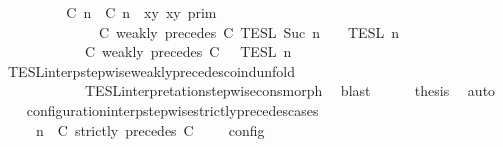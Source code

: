 \begin{isabellebody}
\ {\isacharminus}\isanewline
\ \ \ \ \isamarkupfalse%
\ {\isacartoucheopen}{\isasymlbrakk}\ {\isasymlceil}{\isacharhash}\isactrlsup {\isasymle}\ C\ n{\isacharcomma}\ {\isacharhash}\isactrlsup {\isasymle}\ C\ n{\isasymrceil}\ {\isasymin}\ {\isacharparenleft}{\isasymlambda}{\isacharparenleft}x{\isacharcomma}y{\isacharparenright}{\isachardot}\ x{\isasymle}y{\isacharparenright}\ {\isasymrbrakk}\isactrlsub p\isactrlsub r\isactrlsub i\isactrlsub m\isanewline
\ \ \ \ \ \ \ \ \ \ \ \ {\isasyminter}\ {\isasymlbrakk}\ C\ weakly\ precedes\ C\ {\isasymrbrakk}\isactrlsub T\isactrlsub E\isactrlsub S\isactrlsub L\isactrlbsup {\isasymge}\ Suc\ n\isactrlesup \ {\isasyminter}\ {\isasymlbrakk}{\isasymlbrakk}\ {\isasymPsi}\ {\isasymrbrakk}{\isasymrbrakk}\isactrlsub T\isactrlsub E\isactrlsub S\isactrlsub L\isactrlbsup {\isasymge}\ n\isactrlesup \isanewline
\ \ \ \ \ \ \ \ \ \ {\isacharequal}\ {\isasymlbrakk}{\isasymlbrakk}\ {\isacharparenleft}C\ weakly\ precedes\ C\ {\isacharhash}\ {\isasymPsi}\ {\isasymrbrakk}{\isasymrbrakk}\isactrlsub T\isactrlsub E\isactrlsub S\isactrlsub L\isactrlbsup {\isasymge}\ n\isactrlesup {\isacartoucheclose}\isanewline
\ \ \ \ \ \ \isamarkupfalse%
\ TESL{\isacharunderscore}interp{\isacharunderscore}stepwise{\isacharunderscore}weakly{\isacharunderscore}precedes{\isacharunderscore}coind{\isacharunderscore}unfold\isanewline
\ \ \ \ \ \ \ \ \ \ \ \ TESL{\isacharunderscore}interpretation{\isacharunderscore}stepwise{\isacharunderscore}cons{\isacharunderscore}morph\ \isamarkupfalse%
\ blast\isanewline
\ \ \ \ \isamarkupfalse%
\ {\isacharquery}thesis\ \isamarkupfalse%
\ auto\isanewline
\ \ \isamarkupfalse%
\isanewline
{}\isamarkupfalse%
%
\endisatagproof
{\isafoldproof}%
%
\isadelimproof
\isanewline
%
\endisadelimproof
\isanewline
{}\isamarkupfalse%
\ configuration{\isacharunderscore}interp{\isacharunderscore}stepwise{\isacharunderscore}strictly{\isacharunderscore}precedes{\isacharunderscore}cases{\isacharcolon}\isanewline
\ \ \ {\isacartoucheopen}{\isasymlbrakk}\ {\isasymGamma}{\isacharcomma}\ n\ {\isasymturnstile}\ {\isacharparenleft}{\isacharparenleft}C\ strictly\ precedes\ C\ {\isacharhash}\ {\isasymPsi}{\isacharparenright}\ {\isasymtriangleright}\ {\isasymPhi}\ {\isasymrbrakk}\isactrlsub c\isactrlsub o\isactrlsub n\isactrlsub f\isactrlsub i\isactrlsub g\isanewline

\end{isabellebody}
